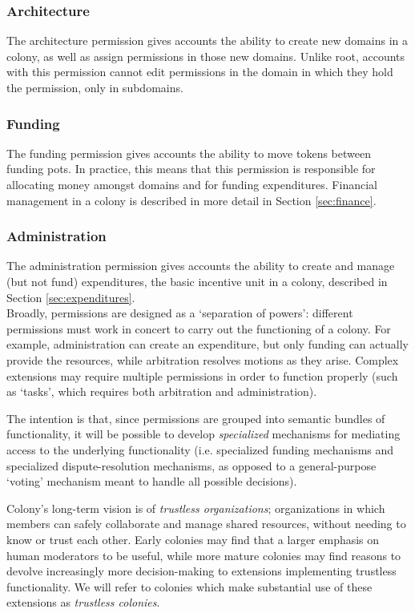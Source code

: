 \subsubsection*{Architecture}

The architecture permission gives accounts the ability to create new domains in a colony, as well as assign permissions in those new domains. Unlike root, accounts with this permission cannot edit permissions in the domain in which they hold the permission, only in subdomains.

\subsubsection*{Funding}

The funding permission gives accounts the ability to move tokens between funding pots. In practice, this means that this permission is responsible for allocating money amongst domains and for funding expenditures. Financial management in a colony is described in more detail in Section \ref{sec:finance}.

\subsubsection*{Administration}

The administration permission gives accounts the ability to create and manage (but not fund) expenditures, the basic incentive unit in a colony, described in Section \ref{sec:expenditures}. \\

Broadly, permissions are designed as a `separation of powers': different permissions must work in concert to carry out the functioning of a colony. For example, administration can create an expenditure, but only funding can actually provide the resources, while arbitration resolves motions as they arise. Complex extensions may require multiple permissions in order to function properly (such as `tasks', which requires both arbitration and administration).

The intention is that, since permissions are grouped into semantic bundles of functionality, it will be possible to develop \textit{specialized} mechanisms for mediating access to the underlying functionality (i.e. specialized funding mechanisms and specialized dispute-resolution mechanisms, as opposed to a general-purpose `voting' mechanism meant to handle all possible decisions).

Colony's long-term vision is of \textit{trustless organizations}; organizations in which members can safely collaborate and manage shared resources, without needing to know or trust each other. Early colonies may find that a larger emphasis on human moderators to be useful, while more mature colonies may find reasons to devolve increasingly more decision-making to extensions implementing trustless functionality. We will refer to colonies which make substantial use of these extensions as \textit{trustless colonies}.

